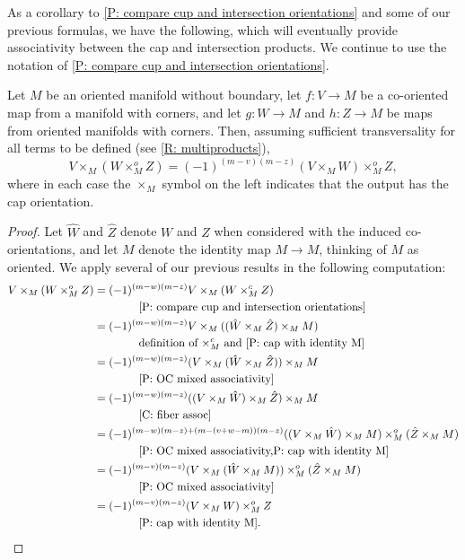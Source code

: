 As a corollary to \cref{P: compare cup and intersection orientations} and some of our previous formulas, we have the following, which will eventually provide associativity between the cap and intersection products.
We continue to use the notation of \cref{P: compare cup and intersection orientations}.

\begin{corollary}\label{C: cap/intersect}
	Let $M$ be an oriented manifold without boundary, let $f \colon V \to M$ be a co-oriented map from a manifold with corners, and let $g \colon W \to M$ and $h \colon Z \to M$ be maps from oriented manifolds with corners.
	Then, assuming sufficient transversality for all terms to be defined (see \cref{R: multiproducts}), $$V \times_M (W \times_M^o Z) = (-1)^{(m-v)(m-z)} (V \times_M W) \times_M^o Z,$$
	where in each case the $\times_M$ symbol on the left indicates that the output has the cap orientation.
\end{corollary}
\begin{proof}
	Let $\hat W$ and $\hat Z$ denote $W$ and $Z$ when considered with the induced co-orientations, and let $M$ denote the identity map $M \to M$, thinking of $M$ as oriented.
	We apply several of our previous results in the following computation:
	\begin{align*}
		V \times_M (W \times_M^o Z)
		&= (-1)^{(m-w)(m-z)} V \times_M (W \times_M^c Z)\\
			&\qquad\qquad \text{\cref{P: compare cup and intersection orientations}}\\
		&= (-1)^{(m-w)(m-z)} V \times_M ((\hat W \times_M \hat Z)\times_M M)\\
			&\qquad\qquad\text{definition of $\times_M^c$ and \cref{P: cap with identity M}}\\
		&= (-1)^{(m-w)(m-z)} (V \times_M (\hat W \times_M \hat Z)) \times_M M\\
			 &\qquad\qquad\text{\cref{P: OC mixed associativity}}\\
		&= (-1)^{(m-w)(m-z)} ((V \times_M \hat W) \times_M \hat Z)\times_M M \\
			&\qquad\qquad\text{\cref{C: fiber assoc}}\\
		&= (-1)^{(m-w)(m-z)+(m-(v+w-m))(m-z)} ((V \times_M \hat W)\times_M M) \times_M^o (\hat Z \times_M M) \\
			&\qquad\qquad\text{\cref{P: OC mixed associativity,P: cap with identity M}}\\
		&= (-1)^{(m-v)(m-z)} (V \times_M (\hat W\times_M M)) \times_M^o (\hat Z \times_M M)\\
			&\qquad\qquad\text{\cref{P: OC mixed associativity}}\\
		&= (-1)^{(m-v)(m-z)} (V \times_M W) \times_M^o Z \\
			&\qquad\qquad \text{\cref{P: cap with identity M}.}
	\end{align*}
\end{proof}

